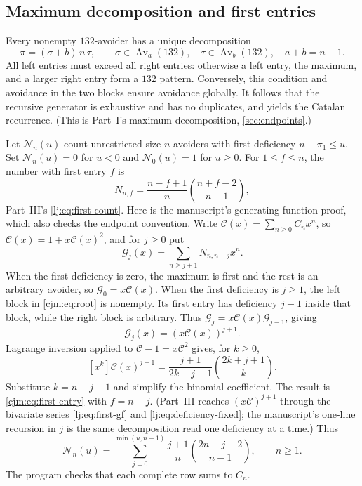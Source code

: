 \documentclass[11pt,a4paper]{article}
\theoremstyle{definition}\newaliascnt{definition}{theorem}
\theoremstyle{remark}\newaliascnt{remark}{theorem}
\newcommand{\Av}{\operatorname{Av}}
\newcommand{\Cat}{\mathcal C}
\begin{document}
\subsection{Maximum decomposition and first entries}
Every nonempty $132$-avoider has a unique decomposition
\begin{equation}
 \pi=(\sigma+b)\,n\,\tau,
 \qquad \sigma\in\Av_a(132),\quad\tau\in\Av_b(132),\quad a+b=n-1.
 \label{cjm:eq:root}
\end{equation}
All left entries must exceed all right entries: otherwise a left entry,
the maximum, and a larger right entry form a $132$ pattern. Conversely,
this condition and avoidance in the two blocks ensure avoidance globally.
It follows that the recursive generator is exhaustive and has no
duplicates, and yields the Catalan recurrence. (This is Part~I's maximum
decomposition, \cref{sec:endpoints}.)

Let $\mathcal N_n(u)$ count unrestricted size-$n$ avoiders with first
deficiency $n-\pi_1\le u$. Set $\mathcal N_n(u)=0$ for $u<0$ and
$\mathcal N_0(u)=1$ for $u\ge0$. For $1\le f\le n$, the number with first
entry $f$ is
\begin{equation}
 N_{n,f}=\frac{n-f+1}{n}\binom{n+f-2}{n-1},
 \label{cjm:eq:first-entry}
\end{equation}
Part~III's \eqref{lj:eq:first-count}. Here is the manuscript's
generating-function proof, which also checks the endpoint convention. Write
$\Cat(x)=\sum_{n\ge0}C_nx^n$, so $\Cat(x)=1+x\Cat(x)^2$, and for $j\ge0$
put
\[
 \mathcal G_j(x)=\sum_{n\ge j+1}N_{n,n-j}x^n.
\]
When the first deficiency is zero, the maximum is first and the rest is
an arbitrary avoider, so $\mathcal G_0=x\Cat(x)$. When the first deficiency is
$j\ge1$, the left block in \eqref{cjm:eq:root} is nonempty. Its first
entry has deficiency $j-1$ inside that block, while the right block is
arbitrary. Thus $\mathcal G_j=x\Cat(x)\mathcal G_{j-1}$, giving
\[
 \mathcal G_j(x)=(x\Cat(x))^{j+1}.
\]
Lagrange inversion applied to $\Cat-1=x\Cat^2$ gives, for $k\ge0$,
\[
 [x^k]\Cat(x)^{j+1}
 =\frac{j+1}{2k+j+1}\binom{2k+j+1}{k}.
\]
Substitute $k=n-j-1$ and simplify the binomial coefficient. The result
is \eqref{cjm:eq:first-entry} with $f=n-j$. (Part~III reaches
$(x\Cat)^{j+1}$ through the bivariate series \eqref{lj:eq:first-gf} and
\eqref{lj:eq:deficiency-fixed}; the manuscript's one-line recursion in $j$
is the same decomposition read one deficiency at a time.) Thus
\begin{equation}
 \mathcal N_n(u)=\sum_{j=0}^{\min(u,n-1)}
       \frac{j+1}{n}\binom{2n-j-2}{n-1},\qquad n\ge1.
 \label{cjm:eq:h-count}
\end{equation}
The program checks that each complete row sums to $C_n$.
\end{document}
